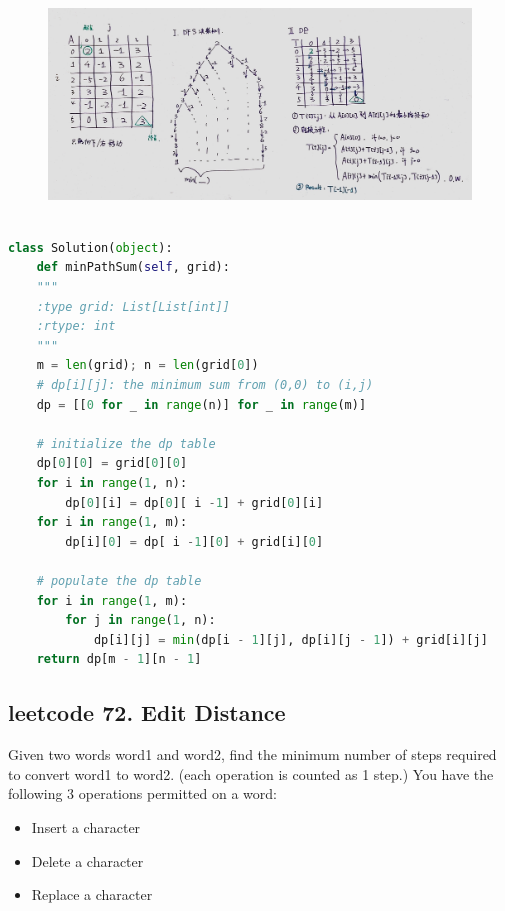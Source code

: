 \documentclass[a4paper,10pt]{article}
\begin{document}
\begin{figure}[h]
\includegraphics[width=\textwidth]{leetcode64.jpg}
\centering
\end{figure}

\begin{lstlisting}[language=Python, caption=Problem64. Minimum Path Sum]

class Solution(object):
    def minPathSum(self, grid):
    """
    :type grid: List[List[int]]
    :rtype: int
    """
    m = len(grid); n = len(grid[0])
    # dp[i][j]: the minimum sum from (0,0) to (i,j)
    dp = [[0 for _ in range(n)] for _ in range(m)]
    
    # initialize the dp table
    dp[0][0] = grid[0][0]
    for i in range(1, n):
        dp[0][i] = dp[0][ i -1] + grid[0][i]
    for i in range(1, m):
        dp[i][0] = dp[ i -1][0] + grid[i][0]
    
    # populate the dp table
    for i in range(1, m):
        for j in range(1, n):
            dp[i][j] = min(dp[i - 1][j], dp[i][j - 1]) + grid[i][j]
    return dp[m - 1][n - 1]
\end{lstlisting}


\subsection{leetcode 72. Edit Distance}
Given two words word1 and word2, find the minimum number of steps required to convert word1 to word2. (each operation is counted as 1 step.) You have the following 3 operations permitted on a word:
\begin{itemize}
    \item Insert a character
    \item Delete a character
    \item Replace a character
\end{itemize}
\end{document}
